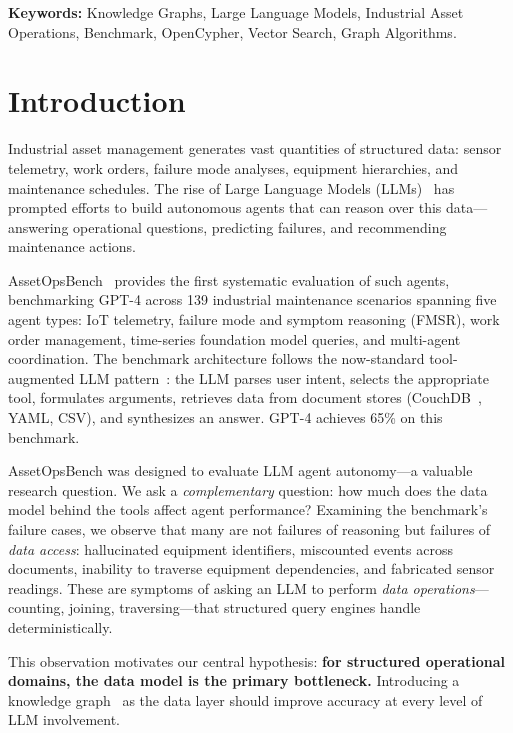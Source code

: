 \documentclass[11pt]{article}
\begin{document}
\noindent\textbf{Keywords:} Knowledge Graphs, Large Language Models, Industrial Asset Operations, Benchmark, OpenCypher, Vector Search, Graph Algorithms.

\section{Introduction}

Industrial asset management generates vast quantities of structured data: sensor telemetry, work orders, failure mode analyses, equipment hierarchies, and maintenance schedules. The rise of Large Language Models (LLMs)~\citep{openai2024gpt4} has prompted efforts to build autonomous agents that can reason over this data---answering operational questions, predicting failures, and recommending maintenance actions.

AssetOpsBench~\citep{ibm2025assetopsbench} provides the first systematic evaluation of such agents, benchmarking GPT-4 across 139 industrial maintenance scenarios spanning five agent types: IoT telemetry, failure mode and symptom reasoning (FMSR), work order management, time-series foundation model queries, and multi-agent coordination. The benchmark architecture follows the now-standard tool-augmented LLM pattern~\citep{schick2023toolformer,yao2023react}: the LLM parses user intent, selects the appropriate tool, formulates arguments, retrieves data from document stores (CouchDB~\citep{anderson2010couchdb}, YAML, CSV), and synthesizes an answer. GPT-4 achieves 65\% on this benchmark.

AssetOpsBench was designed to evaluate LLM agent autonomy---a valuable research question. We ask a \emph{complementary} question: how much does the data model behind the tools affect agent performance? Examining the benchmark's failure cases, we observe that many are not failures of reasoning but failures of \emph{data access}: hallucinated equipment identifiers, miscounted events across documents, inability to traverse equipment dependencies, and fabricated sensor readings. These are symptoms of asking an LLM to perform \emph{data operations}---counting, joining, traversing---that structured query engines handle deterministically.

This observation motivates our central hypothesis: \textbf{for structured operational domains, the data model is the primary bottleneck.} Introducing a knowledge graph~\citep{hogan2021knowledge} as the data layer should improve accuracy at every level of LLM involvement.
\end{document}
